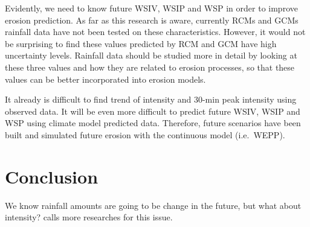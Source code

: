 
Evidently, we need to know future WSIV, WSIP and WSP in order to improve erosion
prediction. As far as this research is aware, currently RCMs and GCMs rainfall
data have not been tested on these characteristics. However, it would not be
surprising to find these values predicted by RCM and GCM have high uncertainty
levels. Rainfall data should be studied more in detail by looking at these three
values and how they are related to erosion processes, so that these values can
be better incorporated into erosion models.

It already is difficult to find trend of intensity and 30-min peak intensity
using observed data. It will be even more difficult to predict future WSIV, WSIP
and WSP using climate model predicted data. Therefore, future scenarios have
been
built and simulated future erosion with the continuous model (i.e.\ WEPP).



%
%
%
%
%

\section{Conclusion}
\label{sec:ObservedRainfallIntensityTrendsConclusion}
We know rainfall amounts are going to be change in the future, but what about
intensity? \citet{trenberth2003-1205} calls more researches for this issue.

